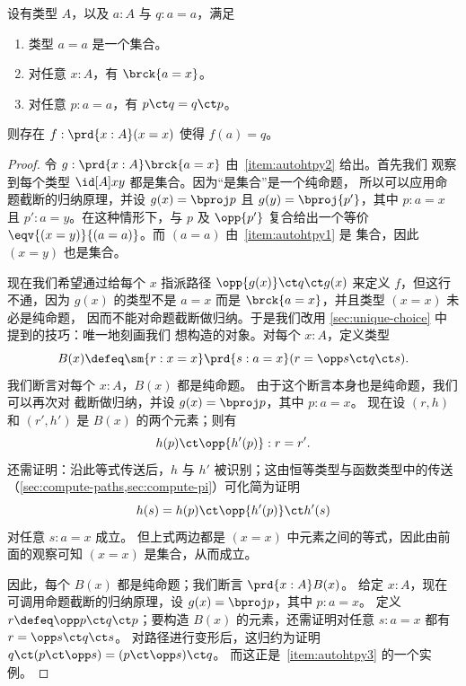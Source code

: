 \begin{lem}\label{lem:autohtpy}
  设有类型 $A$，以及 $a:A$ 与 $q:a=a$，满足
  \begin{enumerate}
  \item 类型 $a=a$ 是一个集合。\label{item:autohtpy1}
  \item 对任意 $x:A$，有 $\brck{a=x}$。\label{item:autohtpy2}
  \item 对任意 $p:a=a$，有 $p\ct q = q \ct p$。\label{item:autohtpy3}
  \end{enumerate}
  则存在 $f:\prd{x:A} (x=x)$ 使得 $f(a)=q$。
\end{lem}
\begin{proof}
  令 $g:\prd{x:A} \brck{a=x}$ 由~\ref{item:autohtpy2} 给出。首先我们
  观察到每个类型 $\id[A]xy$ 都是集合。因为“是集合”是一个纯命题，
  所以可以应用命题截断的归纳原理，并设 $g(x)=\bproj
  p$ 且 $g(y)=\bproj{p'}$，其中 $p:a=x$ 且 $p':a=y$。在这种情形下，与
  $p$ 及 $\opp{p'}$ 复合给出一个等价 $\eqv{(x=y)}{(a=a)}$。而 $(a=a)$ 由~\ref{item:autohtpy1} 是
  集合，因此 $(x=y)$ 也是集合。

  现在我们希望通过给每个 $x$ 指派路径 $\opp{g(x)}
  \ct q \ct g(x)$ 来定义 $f$，但这行不通，因为 $g(x)$ 的类型不是 $a=x$
  而是 $\brck{a=x}$，并且类型 $(x=x)$ 未必是纯命题，
  因而不能对命题截断做归纳。于是我们改用
  \cref{sec:unique-choice} 中提到的技巧：唯一地刻画我们
  想构造的对象。对每个 $x:A$，定义类型
  \[ B(x) \defeq \sm{r:x=x} \prd{s:a=x} (r = \opp s \ct q\ct s).\]
  我们断言对每个 $x:A$，$B(x)$ 都是纯命题。
  由于这个断言本身也是纯命题，我们可以再次对
  截断做归纳，并设 $g(x) = \bproj p$，其中 $p:a=x$。
  现在设 $(r,h)$ 和 $(r',h')$ 是 $B(x)$ 的两个元素；则有
  \[ h(p) \ct \opp{h'(p)} : r = r'. \]
  还需证明：沿此等式传送后，$h$ 与 $h'$ 被识别；这由恒等类型与函数类型中的传送（\cref{sec:compute-paths,sec:compute-pi}）可化简为证明
  \[ h(s) = h(p) \ct \opp{h'(p)} \ct h'(s) \]
  对任意 $s:a=x$ 成立。
  但上式两边都是 $(x=x)$ 中元素之间的等式，因此由前面的观察可知 $(x=x)$ 是集合，从而成立。

  因此，每个 $B(x)$ 都是纯命题；我们断言 $\prd{x:A} B(x)$。
  给定 $x:A$，现在可调用命题截断的归纳原理，设 $g(x) = \bproj p$，其中 $p:a=x$。
  定义 $r \defeq \opp p \ct q \ct p$；要构造 $B(x)$ 的元素，还需证明对任意 $s:a=x$ 都有
  $r = \opp s \ct q \ct s$。
  对路径进行变形后，这归约为证明 $q\ct (p\ct \opp s) = (p\ct \opp s) \ct q$。
  而这正是~\ref{item:autohtpy3} 的一个实例。
\end{proof}

